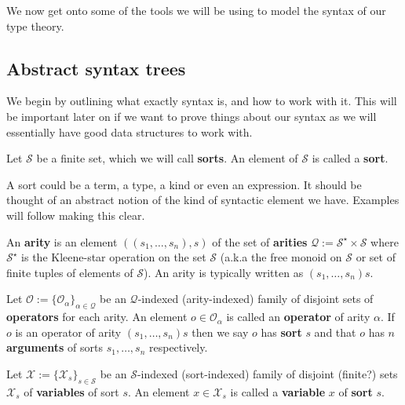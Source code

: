 We now get onto some of the tools we will be using to model the syntax of our type theory. 

\subsection{Abstract syntax trees}

We begin by outlining what exactly syntax is, and how to work with it. This will be important later on if we want to prove things about our syntax as we will essentially have good data structures to work with.


\begin{defin}[Sorts]
    Let $\mathcal{S}$ be a finite set, which we will call \textbf{sorts}. An element of $\mathcal{S}$ is called a \textbf {sort}.
\end{defin}

A sort could be a term, a type, a kind or even an expression. It should be thought of an abstract notion of the kind of syntactic element we have. Examples will follow making this clear.

\begin{defin}[Arities]
    An \textbf{arity} is an element $((s_1,\dots,s_n),s)$ of the set of \textbf{arities} $\mathcal{Q}:=\mathcal{S}^\star \times \mathcal{S}$ where $\mathcal{S}^\star$ is the Kleene-star operation on the set $\mathcal{S}$ (a.k.a the free monoid on $\mathcal{S}$ or set of finite tuples of elements of $\mathcal{S}$). An arity is typically written as $(s_1,\dots,s_n)s$. 
\end{defin}

\begin{defin}[Operators]
    Let $\mathcal{O} :=\{ \mathcal{O}_\alpha \}_{\alpha \in \mathcal{Q}}$ be an $\mathcal{Q}$-indexed (arity-indexed) family of disjoint sets of \textbf{operators} for each arity. An element $o \in \mathcal{O}_\alpha$ is called an \textbf{operator} of arity $\alpha$. If $o$ is an operator of arity $(s_1,\dots,s_n)s$ then we say $o$ has \textbf{sort} $s$ and that $o$ has $n$ \textbf{arguments} of sorts $s_1,\dots,s_n$ respectively.
\end{defin}

\begin{defin}[Variables]
    Let $\mathcal{X}:= \{ \mathcal{X}_s\}_{s \in \mathcal{S}}$ be an $\mathcal{S}$-indexed (sort-indexed) family of disjoint (finite?) sets $\mathcal{X}_s$ of \textbf{variables} of sort $s$. An element $x\in\mathcal{X}_s$ is called a \textbf{variable} $x$ of \textbf{sort} $s$. 
\end{defin}

